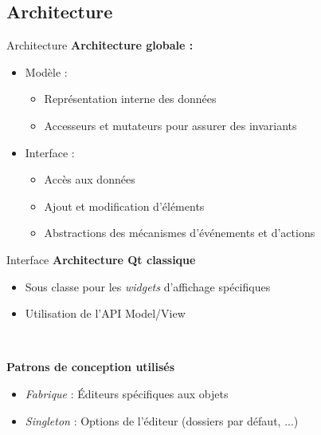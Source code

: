 \documentclass[11pt]{beamer}
\begin{document}
\subsection{Architecture}
\begin{frame}{Architecture}
	\textbf{Architecture globale :}
	\begin{itemize}
		\item Modèle :
		\begin{itemize}
			\item Représentation interne des données
			\item Accesseurs et mutateurs pour assurer des invariants
		\end{itemize}
		\item Interface :
		\begin{itemize}
			\item Accès aux données
			\item Ajout et modification d'éléments
			\item Abstractions des mécanismes d'événements et d'actions
		\end{itemize}
	\end{itemize}

\end{frame}

\begin{frame}{Interface}
	\textbf{Architecture Qt classique}
	\begin{itemize}
		\item Sous classe pour les \textit{widgets} d'affichage spécifiques
		\item Utilisation de l'API Model/View
	\end{itemize}
	
	~
	
	\textbf{Patrons de conception utilisés}
	\begin{itemize}
		\item \textit{Fabrique} : Éditeurs spécifiques aux objets
		\item \textit{Singleton} : Options de l'éditeur (dossiers par défaut, ...)
	\end{itemize}
\end{frame}
\end{document}
